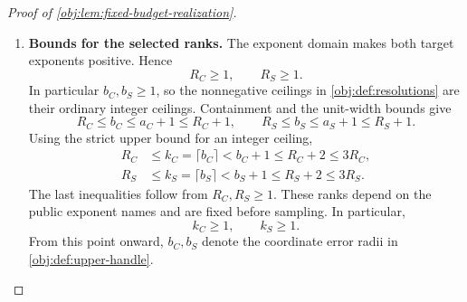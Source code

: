 \begin{proof}[Proof of \cref{obj:lem:fixed-budget-realization}]
\begin{enumerate}
For a power exponent \(\tau\in[0,2]\),
\[
\left|\frac{d}{d\tau}n^\tau\right|
=n^\tau\log n
\le n^2n=n^3,
\]
using \(n\ge1\) and \(\log n\le n\). The mean-value bound and the outward endpoint errors required by \cref{obj:def:arithmetic-engine} therefore show that the returned target boxes satisfy
\[
R_C\in[a_C,b_C],\qquad R_S\in[a_S,b_S],
\]
\[
b_C-a_C,\ b_S-a_S
\le8n^3\epsilon_{\mathrm r}+2\epsilon_{\mathrm r}.
\]
To pay for this width, the integer logarithmic ceiling in \cref{obj:def:resolutions} gives
\[
n\le2^{\lceil\log_2n\rceil},
\qquad
128n^3\epsilon_{\mathrm r}
=
\frac{n^3}{2^{3\lceil\log_2n\rceil}}
\le1.
\]
Since \(n^3\ge1\), it follows that
\[
8n^3\epsilon_{\mathrm r}+2\epsilon_{\mathrm r}
\le10n^3\epsilon_{\mathrm r}
\le\frac{10}{128}\le1.
\]
All rank-step intersections and divisions have thus succeeded, the power inputs satisfy the primitive domain requirements, and both returned boxes have the required unit-width bound.

\item \textbf{Bounds for the selected ranks.}
The exponent domain makes both target exponents positive. Hence
\[
R_C\ge1,\qquad R_S\ge1.
\]
In particular \(b_C,b_S\ge1\), so the nonnegative ceilings in \cref{obj:def:resolutions} are their ordinary integer ceilings. Containment and the unit-width bounds give
\[
R_C\le b_C\le a_C+1\le R_C+1,
\qquad
R_S\le b_S\le a_S+1\le R_S+1.
\]
Using the strict upper bound for an integer ceiling,
\[
\begin{aligned}
R_C&\le k_C=\lceil b_C\rceil<b_C+1\le R_C+2\le3R_C,\\
R_S&\le k_S=\lceil b_S\rceil<b_S+1\le R_S+2\le3R_S.
\end{aligned}
\]
The last inequalities follow from \(R_C,R_S\ge1\). These ranks depend on the public exponent names and are fixed before sampling. In particular,
\[
k_C\ge1,\qquad k_S\ge1.
\]
From this point onward, \(b_C,b_S\) denote the coordinate error radii in \cref{obj:def:upper-handle}.


\end{enumerate}
\end{proof}
